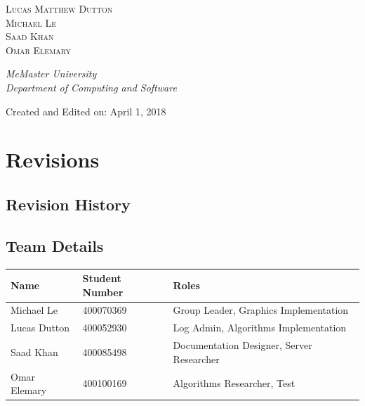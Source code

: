 \documentclass[12pt]{article}
\begin{document}
\begin{titlepage}
	{\scshape\Large Lucas Matthew Dutton \\ Michael Le \\ Saad Khan \\ Omar Elemary\\}
	
	\vspace{0.5\baselineskip} 
	
	\textit{McMaster University \\ Department of Computing and Software} 
	
	\vfill
	
	
	Created and Edited on: April 1, 2018 

\end{titlepage}

\tableofcontents

\newpage

\section{Revisions}

\subsection{Revision History}


\newpage

\subsection{Team Details}

\begin{table}[h]
\begin{tabular}{| l | l | l |}
\hline
\textbf{Name} & \textbf{Student Number} & \textbf{Roles} \\ 
\hline
Michael Le & 400070369 & Group Leader, Graphics Implementation\\ 
\hline
Lucas Dutton & 400052930 & Log Admin, Algorithms Implementation\\ 
\hline
Saad Khan & 400085498 & Documentation Designer, Server Researcher\\ 
\hline
Omar Elemary & 400100169 & Algorithms Researcher, Test\\ 
\hline
\end{tabular}
\end{table}
\end{document}
